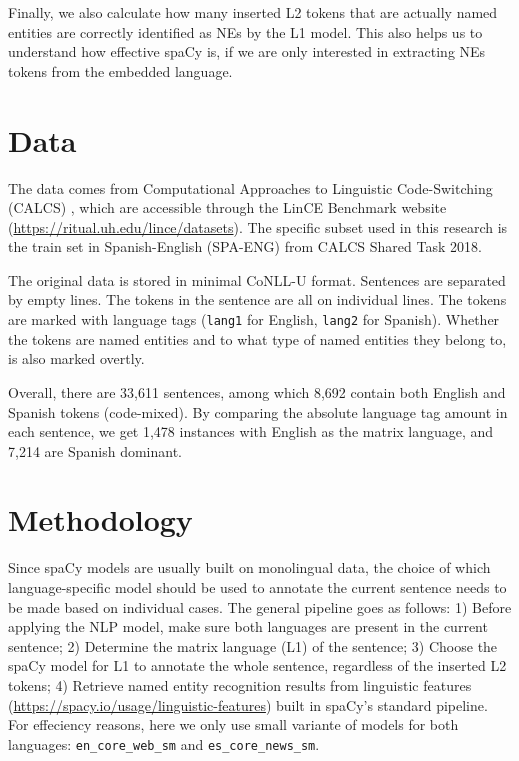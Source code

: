 \documentclass[11pt]{article}
\begin{document}
Finally, we also calculate how many inserted L2 tokens that are actually named entities are correctly identified as NEs by the L1 model. This also helps us to understand how effective spaCy is, if we are only interested in extracting NEs tokens from the embedded language.


\section{Data}

The data comes from Computational Approaches to Linguistic Code-Switching (CALCS) \citep{aguilaretal2018calcs}, which are accessible through the LinCE Benchmark website (\href{https://ritual.uh.edu/lince/datasets}{https://ritual.uh.edu/lince/datasets}). The specific subset used in this research is the train set in Spanish-English (SPA-ENG) from CALCS Shared Task 2018.

The original data is stored in minimal CoNLL-U format. Sentences are separated by empty lines. The tokens in the sentence are all on individual lines. The tokens are marked with language tags (\texttt{lang1} for English, \texttt{lang2} for Spanish). Whether the tokens are named entities and to what type of named entities they belong to, is also marked overtly.

Overall, there are 33,611 sentences, among which 8,692 contain both English and Spanish tokens (code-mixed). By comparing the absolute language tag amount in each sentence, we get 1,478 instances with English as the matrix language, and 7,214 are Spanish dominant.


\section{Methodology}

Since spaCy models are usually built on monolingual data, the choice of which language-specific model should be used to annotate the current sentence needs to be made based on individual cases. The general pipeline goes as follows: 1) Before applying the NLP model, make sure both languages are present in the current sentence; 2) Determine the matrix language (L1) of the sentence; 3) Choose the spaCy model for L1 to annotate the whole sentence, regardless of the inserted L2 tokens; 4) Retrieve named entity recognition results from linguistic features (\href{https://spacy.io/usage/linguistic-features}{https://spacy.io/usage/linguistic-features}) built in spaCy's standard pipeline. For effeciency reasons, here we only use small variante of models for both languages: \texttt{en\_core\_web\_sm} and \texttt{es\_core\_news\_sm}.
\end{document}
